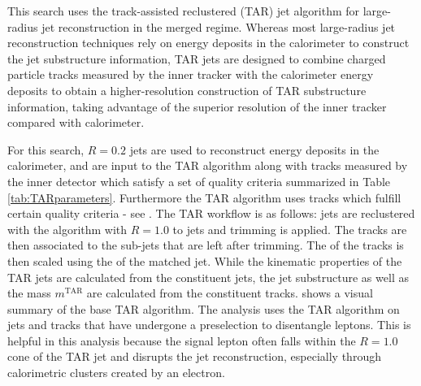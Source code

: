 This search uses the track-assisted reclustered (TAR) jet algorithm \cite{ATL-PHYS-PUB-2018-012} for large-radius jet reconstruction in the merged regime. Whereas most large-radius jet reconstruction techniques rely on energy deposits in the calorimeter to construct the jet substructure information, TAR jets are designed to combine charged particle tracks measured by the inner tracker with the calorimeter energy deposits to obtain a higher-resolution construction of TAR substructure information, taking advantage of the superior resolution of the inner tracker compared with calorimeter. 

For this search, \(R=0.2\) \SmallR jets are used to reconstruct energy deposits in the calorimeter, and are input to the TAR algorithm along with tracks measured by the inner detector which satisfy a set of quality criteria summarized in Table \ref{tab:TARparameters}. Furthermore the TAR algorithm uses tracks which fulfill certain quality criteria - see \Tab{\ref{tab:TARparameters}}. The TAR workflow is as follows: \smallR jets are reclustered with the \akt algorithm with \(R=1.0\) to \largeR jets and trimming is applied. The tracks are then associated to the \smallR sub-jets that are left after trimming. The \pt of the tracks is then scaled using the \pt of the matched \smallR jet. While the kinematic properties of the TAR jets are calculated from the constituent \smallR jets, the jet substructure as well as the mass \(m^\text{TAR}\) are calculated from the constituent tracks. \Fig{\ref{fig:TARAlg}} shows a visual summary of the base TAR algorithm. The analysis uses the TAR algorithm on \smallR jets and tracks that have undergone a preselection to disentangle leptons. This is helpful in this analysis because the signal lepton often falls within the \(R=1.0\) cone of the TAR jet and disrupts the jet reconstruction, especially through calorimetric clusters created by an electron.

